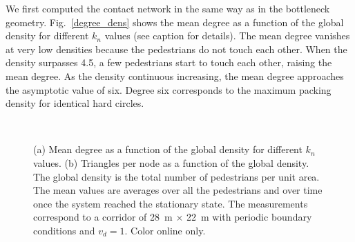 \documentclass[preprint,12pt]{elsarticle}
\begin{document}
We first computed the contact network in the same way  as in the bottleneck
geometry. Fig.~\ref{degree_dens} shows the  mean degree as a function of the
global density for different $k_n$ values (see  caption for details). The mean
degree vanishes at very low  densities because the pedestrians do not touch each
other. When the density  surpasses 4.5, a few pedestrians start to touch each
other,  raising the mean degree. As the density continuous increasing,  the mean
degree approaches the asymptotic value  of six. Degree six corresponds to the
maximum packing density for identical  hard circles.\\


\begin{figure}[!htbp]
\centering
    
\ 
\\
\caption[width=0.47\columnwidth]{(a) Mean degree as a function 
of the global density for different $k_n$ values. (b)  Triangles per node as a 
function of the global density. The global density is the total number of 
pedestrians per unit area. The mean values are averages over all the pedestrians 
and over time once the system reached the stationary state. The measurements 
correspond to a corridor of 28~m $\times$ 22~m with periodic boundary conditions 
and $v_d=1$. Color online only.}
\label{network_corridor}
\end{figure}
\end{document}
